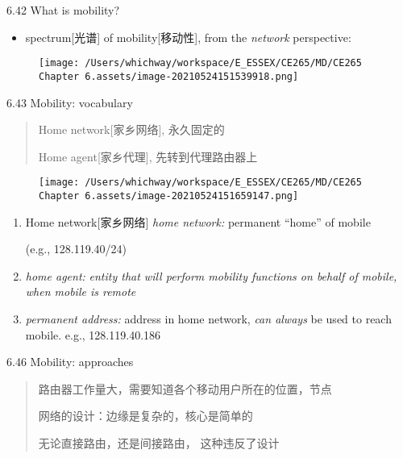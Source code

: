 \documentclass[
]{article}
\begin{document}
6.42 What is mobility?

\begin{itemize}
\item
  spectrum{[}光谱{]} of mobility{[}移动性{]}, from the \emph{network}
  perspective:
\end{itemize}

\begin{figure}
\centering
\texttt{[image: /Users/whichway/workspace/E\_ESSEX/CE265/MD/CE265 Chapter 6.assets/image-20210524151539918.png]}
\caption{}
\end{figure}

6.43 Mobility: vocabulary

\begin{quote}
Home network{[}家乡网络{]}, 永久固定的

Home agent{[}家乡代理{]}, 先转到代理路由器上
\end{quote}

\begin{figure}
\centering
\texttt{[image: /Users/whichway/workspace/E\_ESSEX/CE265/MD/CE265 Chapter 6.assets/image-20210524151659147.png]}
\caption{}
\end{figure}

\begin{enumerate}
\def\labelenumi{\arabic{enumi}.}
\item
  Home network{[}家乡网络{]} \emph{home network:} permanent ``home'' of
  mobile

  (e.g., 128.119.40/24)
\item
  \emph{home agent:} \emph{entity that will perform mobility functions
  on behalf of mobile, when mobile is remote}
\item
  \emph{permanent address:} address in home network, \emph{can always}
  be used to reach mobile. e.g., 128.119.40.186
\end{enumerate}

6.46 Mobility: approaches

\begin{quote}
路由器工作量大，需要知道各个移动用户所在的位置，节点

网络的设计：边缘是复杂的，核心是简单的

无论直接路由，还是间接路由， 这种违反了设计
\end{quote}
\end{document}
